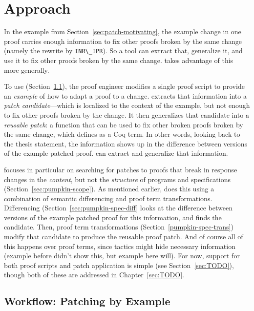 \section{Approach}

In the example from Section~\ref{sec:patch-motivating}, the example change in one proof carries enough information
to fix other proofs broken by the same change (namely the rewrite by \lstinline{INR\_IPR}).
So a tool can extract that, generalize it, and use it to fix other proofs broken by the same change.
\sysname takes advantage of this more generally.

To use \sysname (Section~\ref{sec:pumpkin-workflow}), the proof engineer modifies a single proof script to provide an \textit{example} of how to adapt a proof to a change.
\sysname extracts that information into a \textit{patch candidate}---which is localized to the context of the example, but not enough to fix other proofs broken by the change.
It then generalizes that candidate into a \textit{reusable patch}: a function
that can be used to fix other broken proofs broken by the same change, which \sysname defines as a Coq term.
In other words, looking back to the thesis statement, the information shows up in the difference between versions of the example patched proof.
\sysname can extract and generalize that information.

\sysname focuses in particular on searching for patches to proofs that break in response changes in the \textit{content}, but not the \textit{structure}
of programs and specifications (Section~\ref{sec:pumpkin-scope}).
As mentioned earlier, \sysname does this using a combination of semantic differencing and proof term transformations.
Differencing (Section~\ref{sec:pumpkin-spec-diff} looks at the difference between versions of the example patched proof for this information, and finds the candidate.
Then, proof term transformations (Section~\ref{pumpkin-spec-trans}) modify that candidate to produce the reusable proof patch.
And of course all of this happens over proof terms, since tactics might hide necessary information
(example before didn't show this, but example here will).
For now, support for both proof scripts and patch application is simple (see Section~\ref{sec:TODO}), though both of these are addressed in Chapter~\ref{sec:TODO}.

\subsection{Workflow: Patching by Example}
\label{sec:pumpkin-workflow}

